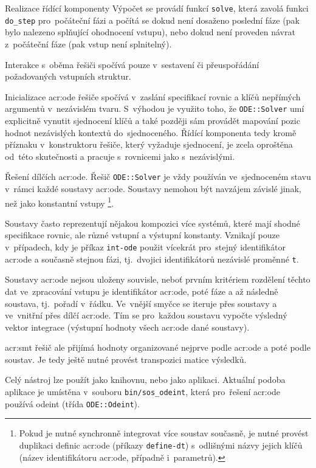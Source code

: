 \documentclass[thesis=M,czech]{FITthesis}[2012/06/26]
\newcommand{\acrlabel}[1]{acr:#1}
\newcommand{\acr}[1]{\acrshort{\acrlabel{#1}}}
\newcommand{\id}[1]{\texttt{#1}}
\newcommand{\binDir}{\id{bin}}
\newcommand{\binFn}[1]{\id{\binDir{}/\-#1}}
\begin{document}
\begin{section}{Realizace řídící komponenty}
Výpočet se provádí funkcí \id{solve},
která zavolá funkci \id{do\_\-step}
pro~počáteční fázi
a počítá se dokud není dosaženo poslední fáze
(pak bylo nalezeno splňující ohodnocení vstupu),
nebo dokud není proveden návrat z~počáteční fáze
(pak vstup není splnitelný).

Interakce s~oběma řešiči
spočívá pouze v~sestavení či přeuspořádání
požadovaných vstupních struktur.


\begin{paragraph}{Inicializace \acr{ode} řešiče}
\label{p:impl:center:ode_init}
spočívá v~zaslání specifikací rovnic a klíčů nepřímých argumentů
v~nezávislém tvaru. S~výhodou je využito toho,
že \id{ODE::\-Solver} umí explicitně
vynutit sjednocení klíčů
a také později sám provádět mapování
pozic hodnot nezávislých kontextů
do~sjednoceného.
Řídící komponenta tedy kromě příznaku
v~konstruktoru řešiče,
který vyžaduje sjednocení,
je zcela oproštěna od~této skutečnosti
a pracuje s~rovnicemi jako s~nezávislými.
\end{paragraph} %


\begin{paragraph}{Řešení dílčích \acr{ode}.}
Řešič \id{ODE::\-Solver} je vždy
používán ve~sjednoceném stavu
v~rámci každé soustavy \acr{ode}.
Soustavy nemohou být navzájem závislé
jinak, než jako konstantní vstupy%
\footnote{Pokud je nutné synchronně integrovat více soustav současně,
je nutné provést duplikaci definic \acr{ode}
(příkazy \id{define\--dt})
s~odlišnými názvy jejich klíčů
(název identifikátoru \acr{ode},
případně i~parametrů).}.

Soustavy často reprezentují nějakou kompozici více systémů,
které mají shodné specifikace rovnic,
ale různé vstupní a výstupní konstanty.
Vznikají pouze v~případech,
kdy je příkaz \id{int\--ode} použit
vícekrát pro~stejný identifikátor \acr{ode}
a současně stejnou fázi,
tj.~dvojici identifikátorů nezávislé proměnné \id{t}.

Soustavy \acr{ode} nejsou uloženy souvisle,
neboť prvním kritériem rozdělení
těchto dat ve~zpracování vstupu
je identifikátor \acr{ode}, poté fáze a až následně soustava,
tj.~pořadí v~řádku.
Ve~vnější smyčce se iteruje přes soustavy
a ve~vnitřní přes dílčí \acr{ode}.
Tím se pro~každou soustavu vypočte výsledný vektor integrace
(výstupní hodnoty všech \acr{ode} dané soustavy).

\acr{smt} řešič ale přijímá hodnoty
organizované nejprve podle \acr{ode} a poté podle soustav.
Je tedy ještě nutné provést transpozici matice výsledků.
\end{paragraph} %


\bigskip

Celý nástroj lze použít jako knihovnu,
nebo jako aplikaci.
Aktuální podoba aplikace je umístěna v~souboru
\binFn{sos\_\-odeint}, která pro~řešení \acr{ode}
používá odeint (třída \id{ODE::\-Odeint}).
\end{section} %
\end{document}
